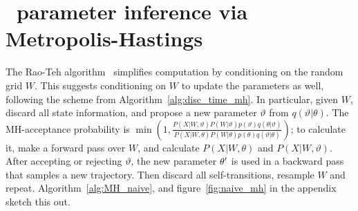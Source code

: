 \vspace{-.1in}
\section{\Naive\ parameter inference via Metropolis-Hastings}
The Rao-Teh algorithm~\cite{RaoTeh13} simplifies
computation by conditioning on the
random grid $W$.
This suggests conditioning on $W$ to update
the parameters as well, following the scheme from
Algorithm~\ref{alg:disc_time_mh}.
In particular, given $W$, discard all state information, and propose a 
new parameter $\vartheta$ from $q(\vartheta|\theta)$. 
The MH-acceptance probability is $\min\left(1,
\frac{P(X|W,\vartheta)P(W|\vartheta)p(\vartheta)q(\theta|\vartheta)}
     {P(X|W,\theta)P(W|\theta)p(\theta)q(\vartheta|\theta)}\right)$; 
     to calculate it,
make a forward pass over $W$, and calculate 
$P(X|W,\theta)$ and $P(X|W,\vartheta)$. %
After accepting or rejecting $\vartheta$, the new parameter $\theta'$ is used in
a backward pass that samples a new trajectory. Then discard all 
self-transitions, resample $W$ and repeat. Algorithm~\ref{alg:MH_naive}, and 
figure~\ref{fig:naive_mh} in the appendix sketch this out.

